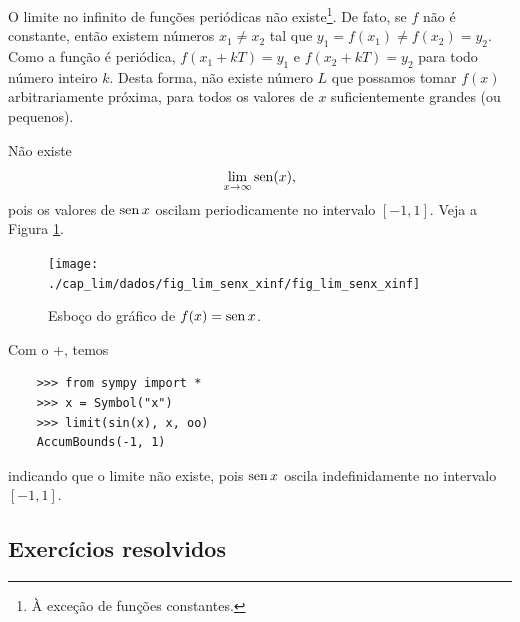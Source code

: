 O limite no infinito de funções periódicas não existe\footnote{À exceção de funções constantes.}. De fato, se $f$ não é constante, então existem números $x_1\neq x_2$ tal que $y_1=f(x_1)\neq f(x_2)=y_2$. Como a função é periódica, $f(x_1+kT)=y_1$ e $f(x_2+kT) = y_2$ para todo número inteiro $k$. Desta forma, não existe número $L$ que possamos tomar $f(x)$ arbitrariamente próxima, para todos os valores de $x$ suficientemente grandes (ou pequenos).

\begin{ex}
  Não existe
  \begin{equation}
    \lim_{x\to \infty} \operatorname{sen}(x),
  \end{equation}
  pois os valores de $\operatorname{sen} x$ oscilam periodicamente no intervalo $[-1, 1]$. Veja a Figura \ref{fig:lim_senx_xinf}.

  \begin{figure}[H]
    \centering
    \texttt{[image: ./cap\_lim/dados/fig\_lim\_senx\_xinf/fig\_lim\_senx\_xinf]}
    \caption{Esboço do gráfico de $f(x)=\operatorname{sen} x$.}
    \label{fig:lim_senx_xinf}
  \end{figure}

  Com o {\python}+{\sympy}, temos

  \begin{lstlisting}
    >>> from sympy import *
    >>> x = Symbol("x")
    >>> limit(sin(x), x, oo)
    AccumBounds(-1, 1)
  \end{lstlisting}

  indicando que o limite não existe, pois $\operatorname{sen} x$ oscila indefinidamente no intervalo $[-1, 1]$.
\end{ex}


\subsection{Exercícios resolvidos}

